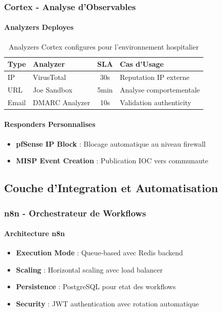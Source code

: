 \subsubsection{Cortex - Analyse d'Observables}

\paragraph{Analyzers Deployes}
\begin{table}[H]
    \centering
    \caption{Analyzers Cortex configures pour l'environnement hospitalier}
    \begin{tabular}{|l|l|c|l|}
        \hline
        \textbf{Type} & \textbf{Analyzer} & \textbf{SLA} & \textbf{Cas d'Usage}    \\
        \hline
        IP            & VirusTotal        & 30s          & Reputation IP externe   \\
        \hline
        URL           & Joe Sandbox       & 5min         & Analyse comportementale \\
        \hline
        Email         & DMARC Analyzer    & 10s          & Validation authenticity \\
        \hline
    \end{tabular}
\end{table}

\paragraph{Responders Personnalises}
\begin{itemize}
    \item \textbf{pfSense IP Block} : Blocage automatique au niveau firewall
    \item \textbf{MISP Event Creation} : Publication IOC vers communaute
\end{itemize}

\subsection{Couche d'Integration et Automatisation}

\subsubsection{n8n - Orchestrateur de Workflows}

\paragraph{Architecture n8n}
\begin{itemize}
    \item \textbf{Execution Mode} : Queue-based avec Redis backend
    \item \textbf{Scaling} : Horizontal scaling avec load balancer
    \item \textbf{Persistence} : PostgreSQL pour etat des workflows
    \item \textbf{Security} : JWT authentication avec rotation automatique
\end{itemize}

